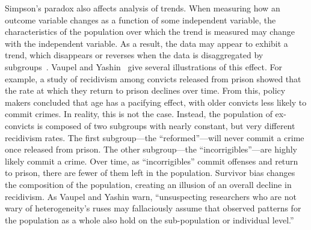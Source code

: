\documentclass{svjour3}
\begin{document}

Simpson's paradox also affects analysis of trends. When measuring how an outcome variable changes as a function of some independent variable, the characteristics of the population over which the trend is measured may change with the independent variable. As a result, the data may appear to exhibit a trend, which disappears or reverses when the data is disaggregated by subgroups~\cite{Alipourfard2018}.
Vaupel and Yashin~\cite{Vaupel85heterogeneity} give several illustrations of %
this effect. For example, a study of recidivism among convicts released from prison showed that the rate at which they return to prison declines over time. From this, policy makers concluded that age has a pacifying effect, with older convicts less likely to commit crimes. In reality, this is not the case. Instead, the population of ex-convicts is composed of two subgroups with nearly constant, but very different recidivism rates. The first subgroup---the ``reformed''---will never commit a crime once released from prison. The other subgroup---the ``incorrigibles''---are highly likely commit a crime. Over time, as ``incorrigibles'' commit offenses and return to prison, there are fewer of them left in the population. Survivor bias changes the composition of the population, creating an illusion of an overall decline in recidivism. As Vaupel and Yashin warn, ``unsuspecting researchers who are not wary of heterogeneity's ruses may fallaciously assume that observed patterns for the population as a whole also hold on the sub-population or individual level.''


\end{document}

